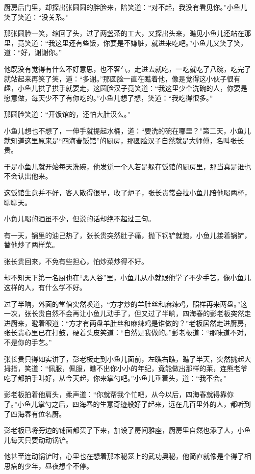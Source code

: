 \documentclass[12pt,oneside]{book}
\begin{document}
厨房后门里，却探出张圆圆的胖脸来，陪笑道：``对不起，我没有看见你。''小鱼儿笑了笑道：``没关系。''

那张圆脸一笑，缩回了头，过了两盏茶的工大，又探出头来，瞧见小鱼儿还站在那里，竟笑道：``我这里还有些饭，你要是不嫌脏，就进来吃吧。''小鱼儿又笑了笑，道：``好，谢谢你。''

他既没有觉得有什么不好意思，也不客气，走进去就吃，一吃就吃了八碗，吃完了就站起来再笑了笑，道：``多谢。''那圆脸一直在瞧着他，像是觉得这小伙子很有趣，小鱼儿拱了拱手就要走，这圆脸汉子竟笑道：``我这里少个洗碗的人，你要是愿意做，每天少不了有你吃的。''小鱼儿想了想，笑道：``我吃得很多。''

那圆脸笑道：``开饭馆的，还怕大肚汉么。''

小鱼儿想也不想了，一伸手就提起水桶，道：``要洗的碗在哪里？''第二天，小鱼儿就知道这里原来是``四海春饭馆''的厨房，那圆脸汉子自然就是大师傅，名叫张长贵。

于是小鱼儿就开始每天洗碗，他发觉一个人若是躲在饭馆的厨房里，那当真是谁也不会认出他来。

这饭馆生意并不好，客人散得很早，收了炉子，张长贵常会拉小鱼儿陪他喝两杯，聊聊天。

小负儿喝的酒虽不少，但说的话却绝不超过三句。

有一天，锅里的油己热了，张长贵突然肚子痛，抛下钢铲就跑，小鱼儿接着锅铲，替他炒了两样菜。

张长贵回来，不免有些担心，怕炒菜炒得不好。

却不知天下第一名厨也在``恶人谷''里，小鱼儿从小就跟他学了不少手艺，像小鱼儿这样的人，有什么学不好。

过了半晌，外面的堂倌突然唤道，``方才炒的羊肚丝和麻辣鸡，照样再来两盘。''这一次，张长贵自然不会再让小鱼儿动手了，但又过了半晌，四海春的彭老板突然走进厨来，瞪着眼道：``方才有两盘羊肚丝和麻辣鸡是谁做的？''老板居然走进厨房，张长贵心里已在打鼓，硬着头皮笑道：``自然是我做的。''彭老板道：``那味道不对，不是你的手艺。''

张长贵只得如实讲了，彭老板走到小鱼儿面前，左瞧右瞧，瞧了半天，突然挑起大拇指，笑道：``佩服，佩服，瞧不出你小小的年纪，竟能做出那样的莱，连熊老爷吃了都拍手叫好，从今天起，你来掌勺吧。''小鱼儿垂着头，道：``我不会。''

彭老板拍着他肩头，柔声道：``你就帮我个忙吧，从今以后，四海春就得靠你了。''小鱼儿掌勺之后，四海春的生意奇迹般好了起来，远在几百里外的人，都听到了四海春有位名厨。

彭老板已将旁边的铺面都买了下来，加设了房间雅座，厨房里自然也添了人，小鱼儿每天只要动动锅铲。

他甚至连动锅铲时，心里也在想着那本秘笼上的武功奥秘，他简直就像是个得了相思病的少年，昼夜想个不停。
\end{document}
